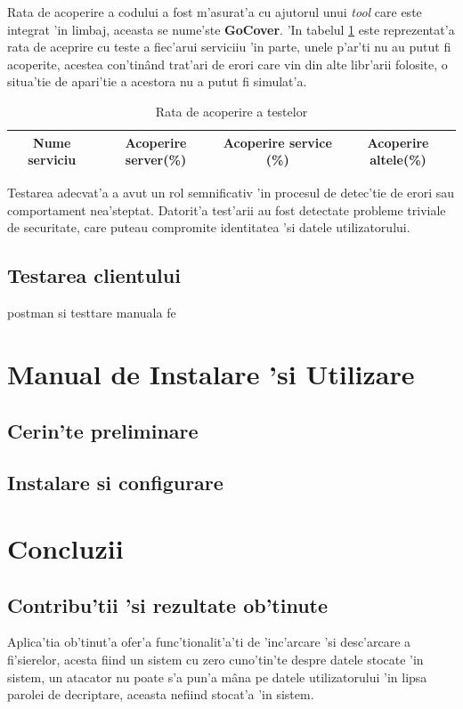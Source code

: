 \documentclass[12pt,a4paper,twoside]{report}
\begin{document}
Rata de acoperire a codului a fost m'asurat'a cu ajutorul unui \textit{tool} care este integrat 'in limbaj, aceasta se nume'ste \textbf{GoCover}. 'In tabelul \ref{table:coverage} este reprezentat'a rata de aceprire cu teste a fiec'arui serviciiu 'in  parte, unele p'ar'ti nu au putut fi acoperite, acestea con'tinând trat'ari de erori care vin din alte libr'arii folosite, o situa'tie de apari'tie a acestora nu a putut fi simulat'a.

\begin{table}[H]
\caption{Rata de acoperire a testelor}
\begin{tabular}{|c|c|c|c|}          
\hline                     
Nume serviciu & Acoperire server(\%) & Acoperire service (\%) & Acoperire altele(\%)   \\ [0.5ex]   
\hline
                              
\end{tabular}
\label{table:coverage}             
\end{table}


Testarea adecvat'a a avut un rol semnificativ 'in procesul de detec'tie de erori sau comportament nea'steptat. Datorit'a test'arii au fost detectate probleme triviale de securitate, care puteau compromite identitatea 'si datele utilizatorului.


\section{Testarea clientului}
postman si testtare manuala fe
\chapter{Manual de Instalare 'si Utilizare}

\section{Cerin'te preliminare}
\section{Instalare si configurare}

\chapter{Concluzii}


\section{Contribu'tii 'si rezultate ob'tinute}
Aplica'tia ob'tinut'a ofer'a func'tionalit'a'ti de 'inc'arcare 'si desc'arcare  a fi'sierelor, acesta fiind un sistem cu zero cuno'tin'te despre datele stocate 'in sistem, un atacator nu poate s'a pun'a mâna pe datele utilizatorului 'in lipsa parolei de decriptare, aceasta nefiind stocat'a 'in sistem.
\end{document}
